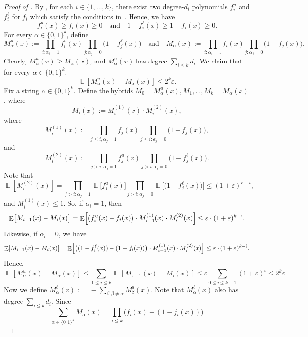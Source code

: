 \documentclass{toc}
\newcommand{\zo}{\{0,1\}}
\def\eps{\varepsilon}
\DeclareMathOperator*{\E}{\mathbb{E}}                 %
\begin{document}
  \begin{proof}[Proof of {}]
    By , for each $i \in \{1, \ldots, k\}$, there exist two degree-$d_i$ polynomials $f_i^u$ and $f_i^\ell$ for $f_i$ which satisfy the conditions in~.
    Hence, we have
    \[
      f_i^u(x) \ge f_i(x) \ge 0
      \quad\text{and}\quad
      1 - f_i^\ell(x) \ge 1 - f_i(x) \ge 0 .
    \]
    For every $\alpha \in \zo^k$, define
    \[
      M_\alpha^u(x) := \prod_{i: \alpha_i = 1} f_i^u(x) \prod_{j: \alpha_j = 0} \bigl( 1 - f_j^\ell(x) \bigr)
    \quad\text{and}\quad
      M_\alpha(x) := \prod_{i: \alpha_i = 1} f_i(x) \prod_{j: \alpha_j = 0} \bigl( 1 - f_j(x) \bigr) .
    \]
    Clearly, $M_\alpha^u(x) \ge M_\alpha(x)$, and $M_\alpha^u(x)$ has degree $\sum_{i \le k} d_i$.
    We claim that for every $\alpha \in \zo^k$, 
    \[
      \E[M_\alpha^u(x) - M_\alpha(x)] \le 2^k \eps .
    \]
    Fix a string $\alpha \in \zo^k$.
    Define the hybrids $M_0 = M_\alpha^u(x), M_1, \ldots, M_k = M_\alpha(x)$, where
    \[
      M_i(x) := M^{(1)}_i(x) \cdot M^{(2)}_i(x),
    \]
    where 
    \[
      M^{(1)}_i(x) := \prod_{j \le i, \alpha_j = 1} f_j(x) \prod_{j \le i: \alpha_j = 0} \bigl(1 - f_j(x) \bigr) ,
    \]
    and
    \[
      M^{(2)}_i(x) := \prod_{j > i: \alpha_j = 1} f_j^u(x) \prod_{j > i: \alpha_j = 0} \bigl(1 - f_j^\ell(x) \bigr) .
    \]
    Note that
    \[ 
      \E[M^{(2)}_i(x)] = \prod_{j > i: \alpha_j = 1} \E \bigl[ f_j^u(x) \bigr] \prod_{j > i: \alpha_j = 0} \E \bigl[ \bigl(1 - f_j^\ell(x) \bigr) \bigr] \le (1 + \eps)^{k-i} ,
    \]
    and $M^{(1)}_i(x) \le 1$.
    So, if $\alpha_i = 1$, then
    \[
      \E \bigl[ M_{i-1}(x) - M_i(x) \bigr] 
      = \E \Bigl[ \bigl( f_i^u(x) - f_i(x) \bigr) \cdot M^{(1)}_{i-1}(x) \cdot M^{(2)}_i(x) \Bigr]
      \le \eps \cdot (1 + \eps)^{k-i} .
    \]
    Likewise, if $\alpha_i = 0$, we have
    \[
      \E[M_{i-1}(x) - M_i(x)] \\
      = \E \Bigl[ \bigl( (1 - f_i^\ell(x)) - (1 - f_i(x)) \bigr) \cdot M^{(1)}_{i-1}(x) \cdot M^{(2)}_i(x) \Bigr]
      \le \eps \cdot (1 + \eps)^{k-i} .
    \]
    Hence, 
    \[
      \E[M_\alpha^u(x) - M_\alpha(x)]
      \le \sum_{1 \le i \le k} \E[M_{i-1}(x) - M_i(x)]
      \le \eps \sum_{0 \le i \le k-1} (1 + \eps)^i
      \le 2^k \eps .
    \]
    Now we define $M_\alpha^\ell(x) := 1 - \sum_{\beta: \beta \neq \alpha} M_\beta^{u}(x)$.
    Note that $M_\alpha^\ell(x)$ also has degree $\sum_{i \le k} d_i$.
    Since
    \[
      \sum_{\alpha \in \zo^k} M_\alpha(x)
      = \prod_{i \le k} \bigl( f_i(x) + (1 - f_i(x)) \bigr)
\]
\end{proof}
\end{document}
